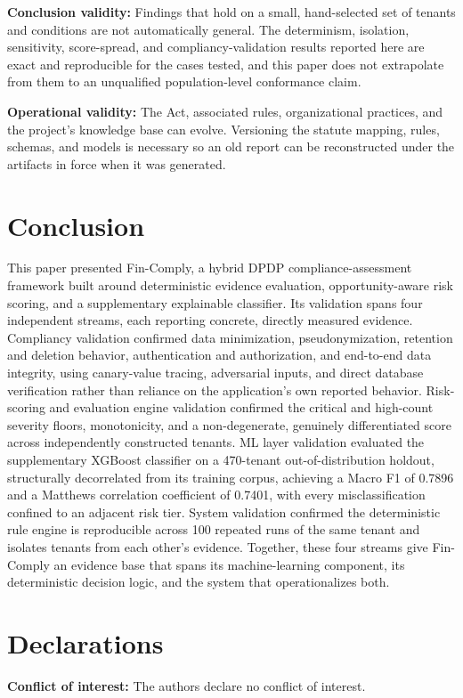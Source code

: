 \documentclass[11pt,a4paper]{article}
\newcommand{\system}{Fin-Comply}
\begin{document}
\textbf{Conclusion validity:} Findings that hold on a small, hand-selected set of tenants and conditions are not automatically general. The determinism, isolation, sensitivity, score-spread, and compliancy-validation results reported here are exact and reproducible for the cases tested, and this paper does not extrapolate from them to an unqualified population-level conformance claim.

\textbf{Operational validity:} The Act, associated rules, organizational practices, and the project's knowledge base can evolve. Versioning the statute mapping, rules, schemas, and models is necessary so an old report can be reconstructed under the artifacts in force when it was generated.

\section{Conclusion}
This paper presented \system, a hybrid DPDP compliance-assessment framework built around deterministic evidence evaluation, opportunity-aware risk scoring, and a supplementary explainable classifier. Its validation spans four independent streams, each reporting concrete, directly measured evidence. Compliancy validation confirmed data minimization, pseudonymization, retention and deletion behavior, authentication and authorization, and end-to-end data integrity, using canary-value tracing, adversarial inputs, and direct database verification rather than reliance on the application's own reported behavior. Risk-scoring and evaluation engine validation confirmed the critical and high-count severity floors, monotonicity, and a non-degenerate, genuinely differentiated score across independently constructed tenants. ML layer validation evaluated the supplementary XGBoost classifier on a 470-tenant out-of-distribution holdout, structurally decorrelated from its training corpus, achieving a Macro F1 of 0.7896 and a Matthews correlation coefficient of 0.7401, with every misclassification confined to an adjacent risk tier. System validation confirmed the deterministic rule engine is reproducible across 100 repeated runs of the same tenant and isolates tenants from each other's evidence. Together, these four streams give \system{} an evidence base that spans its machine-learning component, its deterministic decision logic, and the system that operationalizes both.

\section*{Declarations}
\noindent\textbf{Conflict of interest:} The authors declare no conflict of interest.
\end{document}
